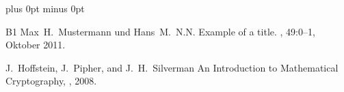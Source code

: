 \documentclass[a4paper,11pt,draft]{article}
\begin{document}
\begin{otherlanguage}{english}
\begin{multicols}{2}

\todos

\begin{thebibliography}{1}
\itemsep=0cm plus 0pt minus 0pt


\bibitem
{B1}
Max~H.\ Mustermann und Hans~M.\ N.N.
\newblock Example of a title.
, 49:0--1, Oktober 2011.

J.~Hoffstein, J.~Pipher, and J.~H.~Silverman
\newblock An Introduction to Mathematical Cryptography,
, 2008.

\end{thebibliography}


\end{multicols}



\end{otherlanguage}
\end{document}

